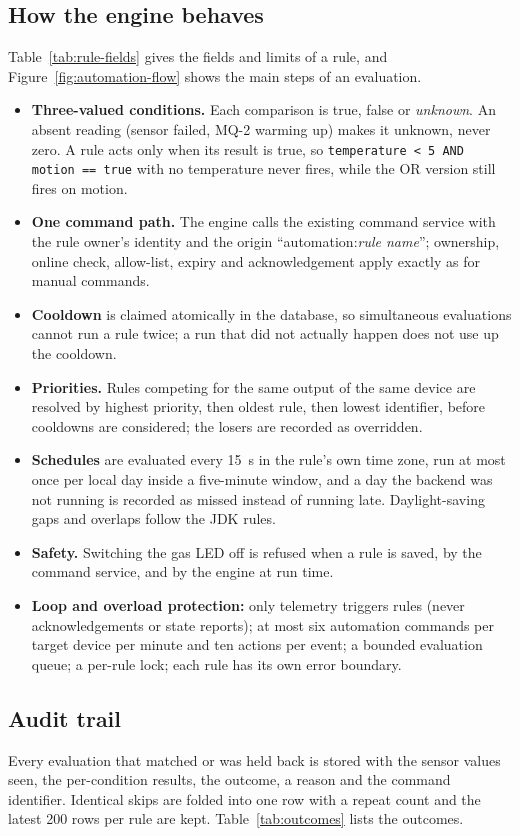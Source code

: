 \documentclass[12pt,a4paper,oneside]{report}
\begin{document}
\subsection{How the engine behaves}
Table~\ref{tab:rule-fields} gives the fields and limits of a rule, and Figure~\ref{fig:automation-flow} shows the main steps of an evaluation.
\begin{itemize}
  \item \textbf{Three-valued conditions.} Each comparison is true, false or \emph{unknown}. An absent reading (sensor failed, MQ-2 warming up) makes it unknown, never zero. A rule acts only when its result is true, so \texttt{temperature < 5 AND motion == true} with no temperature never fires, while the OR version still fires on motion.
  \item \textbf{One command path.} The engine calls the existing command service with the rule owner's identity and the origin ``automation:\emph{rule name}''; ownership, online check, allow-list, expiry and acknowledgement apply exactly as for manual commands.
  \item \textbf{Cooldown} is claimed atomically in the database, so simultaneous evaluations cannot run a rule twice; a run that did not actually happen does not use up the cooldown.
  \item \textbf{Priorities.} Rules competing for the same output of the same device are resolved by highest priority, then oldest rule, then lowest identifier, before cooldowns are considered; the losers are recorded as overridden.
  \item \textbf{Schedules} are evaluated every 15~s in the rule's own time zone, run at most once per local day inside a five-minute window, and a day the backend was not running is recorded as missed instead of running late. Daylight-saving gaps and overlaps follow the JDK rules.
  \item \textbf{Safety.} Switching the gas LED off is refused when a rule is saved, by the command service, and by the engine at run time.
  \item \textbf{Loop and overload protection:} only telemetry triggers rules (never acknowledgements or state reports); at most six automation commands per target device per minute and ten actions per event; a bounded evaluation queue; a per-rule lock; each rule has its own error boundary.
\end{itemize}

\subsection{Audit trail}
Every evaluation that matched or was held back is stored with the sensor values seen, the per-condition results, the outcome, a reason and the command identifier. Identical skips are folded into one row with a repeat count and the latest 200 rows per rule are kept. Table~\ref{tab:outcomes} lists the outcomes.
\end{document}
